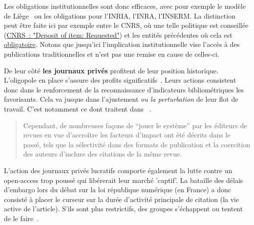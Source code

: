 Les obligations institutionnelles sont donc efficaces, avec pour exemple le modèle de Liège~\cite{rentier_liege_2011} ou les obligations pour l'INRIA, l'INRA, l'INSERM.
La distinction peut être faite ici par exemple entre le CNRS, où une telle politique est conseillée (\href{http://roarmap.eprints.org/139/}{CNRS~: "Deposit of item: Requested"}) et les entités précédentes où cela est \href{http://roarmap.eprints.org/cgi/search/archive/advanced?screen=Search&dataset=archive&country=155&policymaker_type=funder&policymaker_type=research_org&policymaker_type=funder_and_research_org&policymaker_type=multiple_research_orgs&policymaker_type=research_org_subunit&policymaker_name_merge=ALL&policymaker_name=&policy_adoption=&policy_effecive=&deposit_of_item=required&mandate_content_types_merge=ANY&apc_fun_url_merge=ALL&apc_fun_url=&satisfyall=ALL&order=policymaker_name&_action_search=Search}{obligatoire}.
Notons que jusqu'ici l'implication institutionnelle vise l'accès à des publications traditionnelles et n'est pas une remise en cause de celles-ci.

De leur c{\^o}té \textbf{les journaux privés} profitent de leur position historique.
L'oligopole en place s'assure des profits significatifs~\cite{acfas_loligopole_2015}.
Leurs actions consistent donc dans le renforcement de la reconnaissance d'indicateurs bibliométriques les favorisants. 
Cela va jusque dans l'ajustement \emph{ou la perturbation} de leur flot de travail.
C'est notamment ce dont traitent \citeauthor{tort_rising_2012} dans ~\cite{tort_rising_2012}.
\blockcquote[traduction]{tort_rising_2012}{
Cependant, de nombreuses façons de ``jouer le système'' par les éditeurs de revues en vue d'accroître les facteurs d'impact ont été décrits dans le passé, tels que la sélectivité dans des formats de publication et la coercition des auteurs d'inclure des citations de la même revue. %
}
L'action des journaux privés lucratifs comporte également la lutte contre un open-access trop poussé qui libérerait leur marché 'captif'.
La bataille des délais d'embargo lors du débat sur la loi république numérique (en France) a donc consisté à placer le curseur sur la durée d'activité principale de citation (la vie active de l'article).
S'ils sont plus restrictifs, des groupes s'échappent ou tentent de le faire~\cite{modicom_elsevier_????,hameau_lingua_2015,gowers_elsevier_2012,gowers_interesting_2015}.

